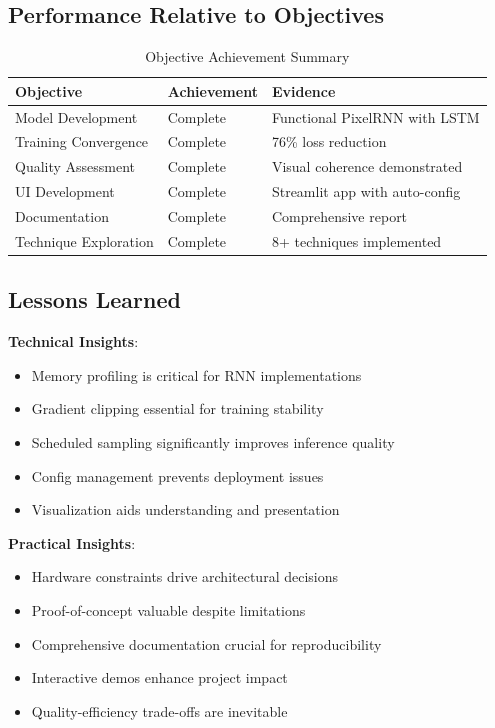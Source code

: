 \documentclass[12pt,a4paper]{article}
\begin{document}
\subsection{Performance Relative to Objectives}

\begin{table}[H]
\centering
\caption{Objective Achievement Summary}
\begin{tabular}{@{}lll@{}}
\toprule
\textbf{Objective} & \textbf{Achievement} & \textbf{Evidence} \\ \midrule
Model Development & Complete & Functional PixelRNN with LSTM \\
Training Convergence & Complete & 76\% loss reduction \\
Quality Assessment & Complete & Visual coherence demonstrated \\
UI Development & Complete & Streamlit app with auto-config \\
Documentation & Complete & Comprehensive report \\
Technique Exploration & Complete & 8+ techniques implemented \\ \bottomrule
\end{tabular}
\end{table}

\subsection{Lessons Learned}

\textbf{Technical Insights}:
\begin{itemize}
    \item Memory profiling is critical for RNN implementations
    \item Gradient clipping essential for training stability
    \item Scheduled sampling significantly improves inference quality
    \item Config management prevents deployment issues
    \item Visualization aids understanding and presentation
\end{itemize}

\textbf{Practical Insights}:
\begin{itemize}
    \item Hardware constraints drive architectural decisions
    \item Proof-of-concept valuable despite limitations
    \item Comprehensive documentation crucial for reproducibility
    \item Interactive demos enhance project impact
    \item Quality-efficiency trade-offs are inevitable
\end{itemize}
\end{document}

